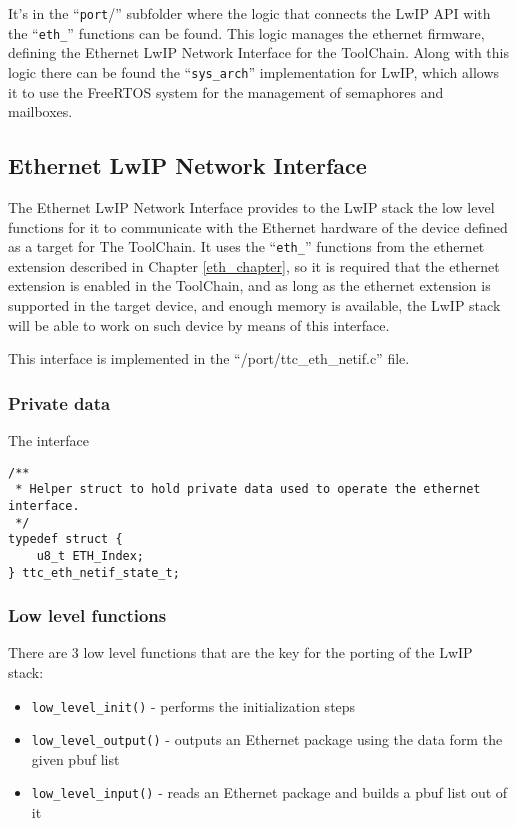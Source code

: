 It's in the ``\verb/port//'' subfolder where the logic that connects the LwIP API with the ``\verb/eth_/'' functions can be found. This logic manages the ethernet firmware, defining the Ethernet LwIP Network Interface for the ToolChain. Along with this logic there can be found the ``\verb/sys_arch/'' implementation for LwIP, which allows it to use the FreeRTOS system for the management of semaphores and mailboxes.

\subsection {Ethernet LwIP Network Interface}

The Ethernet LwIP Network Interface provides to the LwIP stack the low level functions for it to communicate with the Ethernet hardware of the device defined as a target for The ToolChain. It uses the ``\verb/eth_/'' functions from the ethernet extension described in Chapter \ref{eth_chapter}, so it is required that the ethernet extension is enabled in the ToolChain, and as long as the ethernet extension is supported in the target device, and enough memory is available, the LwIP stack will be able to work on such device by means of this interface.

This interface is implemented in the ``/port/ttc\_eth\_netif.c'' file.

\subsubsection{Private data}

The interface

\begin{lstlisting}
/**
 * Helper struct to hold private data used to operate the ethernet interface.
 */
typedef struct {
    u8_t ETH_Index;
} ttc_eth_netif_state_t;
\end{lstlisting}

\subsubsection{Low level functions}

There are 3 low level functions that are the key for the porting of the LwIP stack:

\begin{itemize}
  \item \verb/low_level_init()/ - performs the initialization steps
  \item \verb/low_level_output()/ - outputs an Ethernet package using the data form the given pbuf list
  \item \verb/low_level_input()/ - reads an Ethernet package and builds a pbuf list out of it
\end{itemize}


